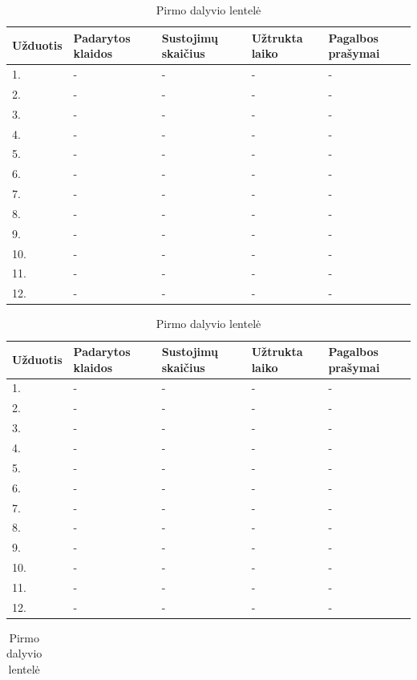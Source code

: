 \documentclass[oneside]{VUMIFPSkursinis}
\begin{document}
\begin{center}
\begin{table}[!pht]
	\caption{Pirmo dalyvio lentelė}
	\begin{tabular}{ |p{1.8cm} | p{3.4cm} | p{3.4cm} | p{2.5cm} | p{3.5cm}|}
	\hline
	Užduotis&Padarytos klaidos&Sustojimų skaičius&Užtrukta laiko&Pagalbos prašymai\\ \hline
1.&-&-&-&- \\ \hline
2.&-&-&-&- \\ \hline
3.&-&-&-&- \\ \hline
4.&-&-&-&- \\ \hline
5.&-&-&-&- \\ \hline
6.&-&-&-&- \\ \hline
7.&-&-&-&- \\ \hline
8.&-&-&-&- \\ \hline
9.&-&-&-&- \\ \hline
10.&-&-&-&- \\ \hline
11.&-&-&-&- \\ \hline
12.&-&-&-&- \\ \hline
\end{tabular}
\end{table}
\vspace{0.7cm}
	\begin{table}[!pht]
	\caption{Pirmo dalyvio lentelė}
	\begin{tabular}{ |p{1.8cm} | p{3.4cm} | p{3.4cm} | p{2.5cm} | p{3.5cm}|}
	\hline
	Užduotis&Padarytos klaidos&Sustojimų skaičius&Užtrukta laiko&Pagalbos prašymai\\ \hline
1.&-&-&-&- \\ \hline
2.&-&-&-&- \\ \hline
3.&-&-&-&- \\ \hline
4.&-&-&-&- \\ \hline
5.&-&-&-&- \\ \hline
6.&-&-&-&- \\ \hline
7.&-&-&-&- \\ \hline
8.&-&-&-&- \\ \hline
9.&-&-&-&- \\ \hline
10.&-&-&-&- \\ \hline
11.&-&-&-&- \\ \hline
12.&-&-&-&- \\ \hline
\end{tabular}
\end{table}
\vspace{0.7cm}
	\begin{table}[!pht]
	\caption{Pirmo dalyvio lentelė}
	\begin{tabular}{ |p{1.8cm} | p{3.4cm} | p{3.4cm} | p{2.5cm} | p{3.5cm}|}

\end{tabular}
\end{table}
\end{center}
\end{document}
